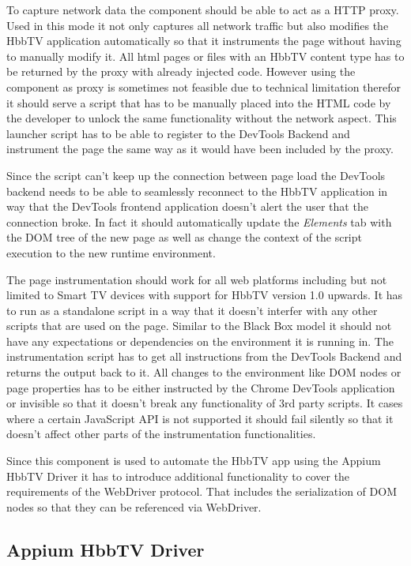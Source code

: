 To capture network data the component should be able to act as a HTTP proxy. Used in this
mode it not only captures all network traffic but also modifies the HbbTV application
automatically so that it instruments the page without having to manually modify it. All
html pages or files with an HbbTV content type has to be returned by the proxy with already
injected code. However using the component as proxy is sometimes not feasible due to technical
limitation therefor it should serve a script that has to be manually placed into the HTML code
by the developer to unlock the same functionality without the network aspect. This launcher
script has to be able to register to the DevTools Backend and instrument the page the same way
as it would have been included by the proxy.

Since the script can't keep up the connection between page load the DevTools backend needs to
be able to seamlessly reconnect to the HbbTV application in way that the DevTools frontend
application doesn't alert the user that the connection broke. In fact it should automatically
update the \textit{Elements} tab with the DOM tree of the new page as well as change the context
of the script execution to the new runtime environment.

The page instrumentation should work for all web platforms including but not limited to Smart TV
devices with support for HbbTV version 1.0 upwards. It has to run as a standalone script in
a way that it doesn't interfer with any other scripts that are used on the page. Similar to the
Black Box model it should not have any expectations or dependencies on the environment it is
running in. The instrumentation script has to get all instructions from the DevTools Backend and
returns the output back to it. All changes to the environment like DOM nodes or page properties
has to be either instructed by the Chrome DevTools application or invisible so that it doesn't
break any functionality of 3rd party scripts. It cases where a certain JavaScript API is not
supported it should fail silently so that it doesn't affect other parts of the instrumentation
functionalities.

Since this component is used to automate the HbbTV app using the Appium HbbTV Driver it has to
introduce additional functionality to cover the requirements of the WebDriver protocol. That
includes the serialization of DOM nodes so that they can be referenced via WebDriver.

\subsection{Appium HbbTV Driver}

